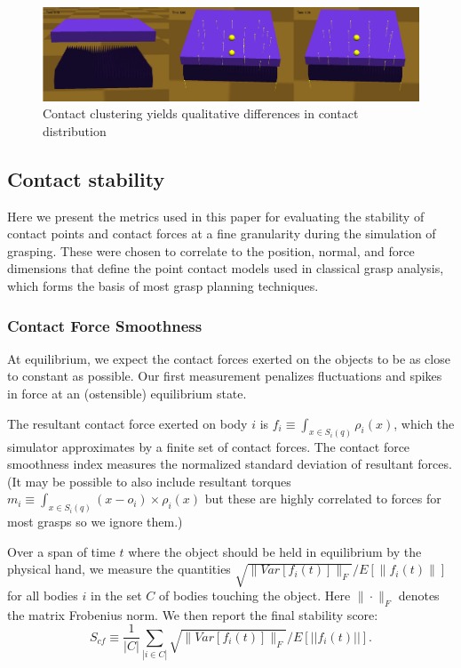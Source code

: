 \begin{figure}[!hbt]
\begin{center}
        \includegraphics[width=0.95\columnwidth]     {images/ssoch/clustering}
        \caption{Contact clustering yields qualitative differences in contact distribution}
        \label{fig:clustering}
        \end{center}
\end{figure}


\subsection{Contact stability}

Here we present the metrics used in this paper for evaluating the stability of contact points and contact forces at a fine granularity during the simulation of grasping.  These were chosen to correlate to the position, normal, and force dimensions that define the point contact models used in classical grasp analysis, which forms the basis of most grasp planning techniques.

\subsubsection{Contact Force Smoothness}

At equilibrium, we expect the contact forces exerted on the objects to be as close to constant as possible. Our first measurement penalizes fluctuations and spikes in force at an (ostensible) equilibrium state. 

The resultant contact force exerted on body $i$  is $f_i \equiv \int_{x\in S_i(q)} \rho_i(x)$, which the simulator approximates by a finite set of contact forces.  The contact force smoothness index measures the normalized standard deviation of resultant forces. (It may be possible to also include resultant torques  $m_i \equiv \int_{x\in S_i(q)} (x-o_i) \times \rho_i(x)$ but these are highly correlated to forces for most grasps so we ignore them.) 

Over a span of time $t$ where the object should be held in equilibrium by the physical hand, we measure the quantities $\sqrt{\|Var[f_i(t)]\|_F} / E[\|f_i(t)\|]$ for all bodies $i$ in the set $C$ of bodies touching the object.  Here $\|\cdot\|_F$ denotes the matrix Frobenius norm. We then report the final stability score:
\begin{equation}
S_{cf} \equiv \frac{1}{|C|} \sum_{|i\in C|} \sqrt{\|Var[f_i(t)]\|_F} / E[||f_i(t)||].
\end{equation}

